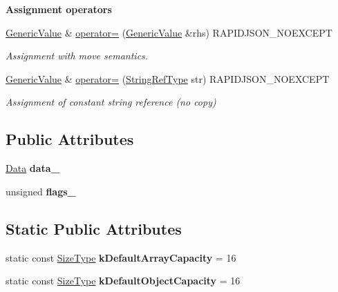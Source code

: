 \begin{Indent}{\bf Assignment operators}\par
\begin{DoxyCompactItemize}
\item 
\hyperlink{class_generic_value}{Generic\+Value} \& \hyperlink{class_generic_value_a9018a40d7c52efc00daf803c51d3236c}{operator=} (\hyperlink{class_generic_value}{Generic\+Value} \&rhs) R\+A\+P\+I\+D\+J\+S\+O\+N\+\_\+\+N\+O\+E\+X\+C\+E\+P\+T
\begin{DoxyCompactList}\small\item\em Assignment with move semantics. \end{DoxyCompactList}\item 
\hyperlink{class_generic_value}{Generic\+Value} \& \hyperlink{class_generic_value_a386708557555e6389184de608af5e6a6}{operator=} (\hyperlink{class_generic_value_a32e0f30ee278072374c8168b14d3317f}{String\+Ref\+Type} str) R\+A\+P\+I\+D\+J\+S\+O\+N\+\_\+\+N\+O\+E\+X\+C\+E\+P\+T
\begin{DoxyCompactList}\small\item\em Assignment of constant string reference (no copy) \end{DoxyCompactList}\end{DoxyCompactItemize}
\end{Indent}
\subsection*{Public Attributes}
\begin{DoxyCompactItemize}
\item 
\hypertarget{class_generic_value_aaf80f2c91d26fdde60b9edeeecd3509f}{}\hyperlink{union_generic_value_1_1_data}{Data} {\bfseries data\+\_\+}\label{class_generic_value_aaf80f2c91d26fdde60b9edeeecd3509f}

\item 
\hypertarget{class_generic_value_ad0f9ce0bc0d1714678a77a2295da420c}{}unsigned {\bfseries flags\+\_\+}\label{class_generic_value_ad0f9ce0bc0d1714678a77a2295da420c}

\end{DoxyCompactItemize}
\subsection*{Static Public Attributes}
\begin{DoxyCompactItemize}
\item 
\hypertarget{class_generic_value_a188f57bdb1923c1fefe74baa995871a3}{}static const \hyperlink{rapidjson_8h_a5ed6e6e67250fadbd041127e6386dcb5}{Size\+Type} {\bfseries k\+Default\+Array\+Capacity} = 16\label{class_generic_value_a188f57bdb1923c1fefe74baa995871a3}

\item 
\hypertarget{class_generic_value_a284d018914629aed9a4bd97fe2dc5899}{}static const \hyperlink{rapidjson_8h_a5ed6e6e67250fadbd041127e6386dcb5}{Size\+Type} {\bfseries k\+Default\+Object\+Capacity} = 16\label{class_generic_value_a284d018914629aed9a4bd97fe2dc5899}

\end{DoxyCompactItemize}
